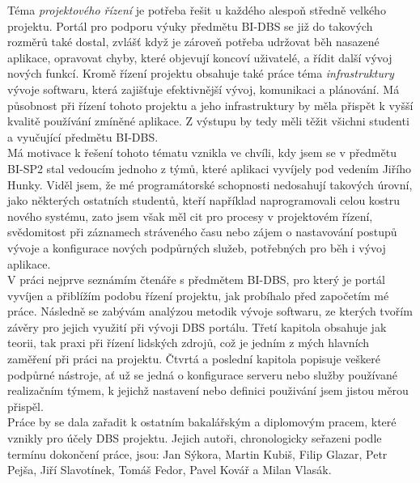 Téma \emph{projektového řízení} je potřeba řešit u každého alespoň středně velkého projektu. Portál pro podporu výuky předmětu BI-DBS se již do takových rozměrů také dostal, zvlášť když je zároveň potřeba udržovat běh nasazené aplikace, opravovat chyby, které objevují koncoví uživatelé, a řídit další vývoj nových funkcí. Kromě řízení projektu obsahuje také práce téma \emph{infrastruktury} vývoje softwaru, která zajišťuje efektivnější vývoj, komunikaci a plánování. Má působnost při řízení tohoto projektu a jeho infrastruktury by měla přispět k vyšší kvalitě používání zmíněné aplikace. Z výstupu by tedy měli těžit všichni studenti a vyučující předmětu BI-DBS.\\
Má motivace k řešení tohoto tématu vznikla ve chvíli, kdy jsem se v předmětu BI-SP2 stal vedoucím jednoho z týmů, které aplikaci vyvíjely pod vedením Jiřího Hunky. Viděl jsem, že mé programátorské schopnosti nedosahují takových úrovní, jako některých ostatních studentů, kteří například naprogramovali celou kostru nového systému, zato jsem však měl cit pro procesy v projektovém řízení, svědomitost při záznamech stráveného času nebo zájem o nastavování postupů vývoje a konfigurace nových podpůrných služeb, potřebných pro běh i vývoj aplikace.\\
V práci nejprve seznámím čtenáře s předmětem BI-DBS, pro který je portál vyvíjen a přiblížím podobu řízení projektu, jak probíhalo před započetím mé práce. Následně se zabývám analýzou metodik vývoje softwaru, ze kterých tvořím závěry pro jejich využití při vývoji DBS portálu. Třetí kapitola obsahuje jak teorii, tak praxi při řízení lidských zdrojů, což je jedním z mých hlavních zaměření při práci na projektu. Čtvrtá a poslední kapitola popisuje veškeré podpůrné nástroje, ať už se jedná o konfigurace serveru nebo služby používané realizačním týmem, k jejichž nastavení nebo definici použivání jsem jistou měrou přispěl.\\
Práce by se dala zařadit k ostatním bakalářským a diplomovým pracem, které vznikly pro účely DBS projektu. Jejich autoři, chronologicky seřazeni podle termínu dokončení práce, jsou: Jan Sýkora, Martin Kubiš, Filip Glazar, Petr Pejša, Jiří Slavotínek, Tomáš Fedor, Pavel Kovář a Milan Vlasák.
